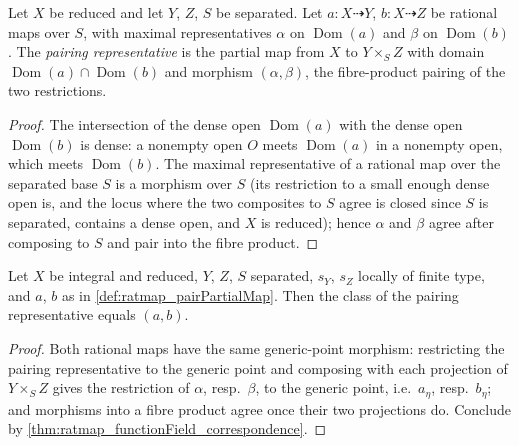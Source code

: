 \begin{definition}
  \label{def:ratmap_pairPartialMap}
  \leanok
  Let \(X\) be reduced and let \(Y\), \(Z\), \(S\) be separated. Let
  \(a : X \dashrightarrow Y\), \(b : X \dashrightarrow Z\) be rational maps over
  \(S\), with maximal representatives \(\alpha\) on \(\operatorname{Dom}(a)\)
  and \(\beta\) on \(\operatorname{Dom}(b)\). The \emph{pairing representative}
  is the partial map from \(X\) to \(Y \times_S Z\) with domain
  \(\operatorname{Dom}(a) \cap \operatorname{Dom}(b)\) and morphism
  \((\alpha, \beta)\), the fibre-product pairing of the two restrictions.
\end{definition}
\begin{proof}
  \leanok
  The intersection of the dense open \(\operatorname{Dom}(a)\) with the dense
  open \(\operatorname{Dom}(b)\) is dense: a nonempty open \(O\) meets
  \(\operatorname{Dom}(a)\) in a nonempty open, which meets
  \(\operatorname{Dom}(b)\). The maximal representative of a rational map over
  the separated base \(S\) is a morphism over \(S\) (its restriction to a small
  enough dense open is, and the locus where the two composites to \(S\) agree is
  closed since \(S\) is separated, contains a dense open, and \(X\) is reduced);
  hence \(\alpha\) and \(\beta\) agree after composing to \(S\) and pair into
  the fibre product.
\end{proof}

\begin{lemma}
  \label{lem:ratmap_pairPartialMap_represents}
  \leanok
  Let \(X\) be integral and reduced, \(Y\), \(Z\), \(S\) separated, \(s_Y\),
  \(s_Z\) locally of finite type, and \(a\), \(b\) as in
  \ref{def:ratmap_pairPartialMap}. Then the class of the pairing representative
  equals \((a, b)\).
\end{lemma}
\begin{proof}
  \leanok
  Both rational maps have the same generic-point morphism: restricting the
  pairing representative to the generic point and composing with each projection
  of \(Y \times_S Z\) gives the restriction of \(\alpha\), resp.\ \(\beta\), to
  the generic point, i.e.\ \(a_\eta\), resp.\ \(b_\eta\); and morphisms into a
  fibre product agree once their two projections do. Conclude by
  \ref{thm:ratmap_functionField_correspondence}.
\end{proof}

